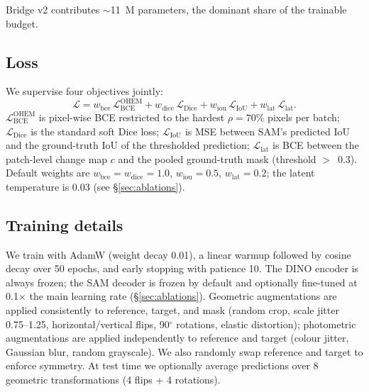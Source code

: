 Bridge v2 contributes $\sim$11~M parameters, the dominant share of the
trainable budget.

\subsection{Loss}
\label{sec:loss}

We supervise four objectives jointly:
\begin{equation}
  \mathcal{L} = w_\text{bce}\,\mathcal{L}_\text{BCE}^\text{OHEM}
              + w_\text{dice}\,\mathcal{L}_\text{Dice}
              + w_\text{iou}\,\mathcal{L}_\text{IoU}
              + w_\text{lat}\,\mathcal{L}_\text{lat}.
\end{equation}
$\mathcal{L}_\text{BCE}^\text{OHEM}$ is pixel-wise BCE restricted to the
hardest $\rho=70\%$ pixels per batch; $\mathcal{L}_\text{Dice}$ is the
standard soft Dice loss; $\mathcal{L}_\text{IoU}$ is MSE between SAM's
predicted IoU and the ground-truth IoU of the thresholded prediction;
$\mathcal{L}_\text{lat}$ is BCE between the patch-level change map $c$ and the
pooled ground-truth mask (threshold $>$~0.3). Default weights are
$w_\text{bce}=w_\text{dice}=1.0$, $w_\text{iou}=0.5$, $w_\text{lat}=0.2$; the
latent temperature is 0.03 (see \S\ref{sec:ablations}).

\subsection{Training details}

We train with AdamW (weight decay 0.01), a linear warmup followed by cosine
decay over 50 epochs, and early stopping with patience 10. The DINO encoder
is always frozen; the SAM decoder is frozen by default and optionally
fine-tuned at 0.1$\times$ the main learning rate (\S\ref{sec:ablations}).
Geometric augmentations are applied consistently to reference, target, and
mask (random crop, scale jitter 0.75--1.25, horizontal/vertical flips, 90$^\circ$
rotations, elastic distortion); photometric augmentations are applied
independently to reference and target (colour jitter, Gaussian blur, random
grayscale). We also randomly swap reference and target to enforce symmetry.
At test time we optionally average predictions over 8 geometric
transformations (4 flips + 4 rotations).
